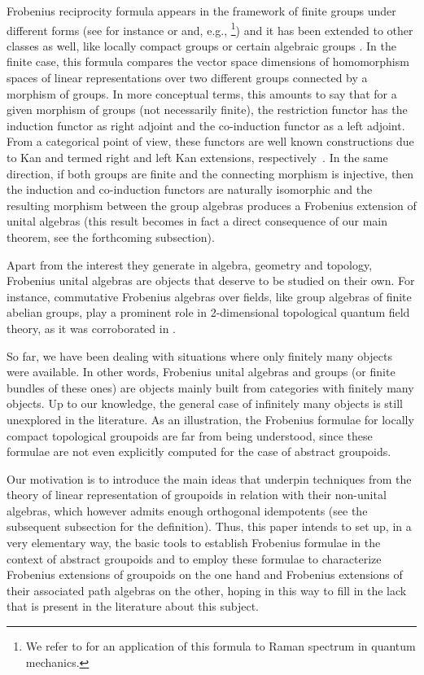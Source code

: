 \documentclass[10pt,a4paper]{amsart}
\numberwithin{equation}{section}
\begin{document}
Frobenius reciprocity formula appears in the framework of finite groups under different forms (see for instance \cite[equation~(3.4), p.~109]{Sternberg:1994} or \cite[equation~(3.7), p.~111]{Sternberg:1994} and, e.g., \cite[Proposition~2.3.9]{Kowalski:2014}\footnote{We refer to \cite[Section~3.6, p.~128]{Sternberg:1994} for an application of this formula to Raman spectrum in quantum mechanics.}) and it has been extended to other classes as well, like locally compact groups \cite{Mackey:1953, MooreC:1962} or certain algebraic groups \cite{Howe:1971}. In the finite case, this formula compares the vector space dimensions of homomorphism spaces of linear representations over two different groups connected by a morphism of groups. In more conceptual terms, this amounts to say that for a given morphism of groups (not necessarily finite), the restriction
functor has the induction functor as right adjoint and the co-induction functor as a left adjoint. From a categorical point of view, these functors are well known constructions due to Kan and termed right and left Kan extensions, respectively~\cite{MacLane}. In the same direction, if both groups are finite and the connecting morphism is injective, then the induction and co-induction functors are naturally isomorphic and the resulting morphism between the group algebras produces a Frobenius extension of unital algebras \cite{Kadison:1999} (this result becomes in fact a direct consequence of our main theorem, see the forthcoming subsection).

Apart from the interest they generate in algebra, geometry and topology, Frobenius unital algebras are objects that deserve to be studied on their own. For instance, commutative Frobenius algebras over fields, like group algebras of finite abelian groups, play a prominent role in 2-dimensional topological quantum field theory, as it was corroborated in \cite{Kock:2003}.

So far, we have been dealing with situations where only finitely many objects were available. In other words, Frobenius unital algebras and groups (or finite bundles of these ones) are objects mainly built from categories with finitely many objects. Up to our knowledge, the general case of infinitely many objects is still unexplored in the literature. As an illustration, the Frobenius formulae for locally compact topological groupoids are far from being understood, since these formulae are not even explicitly computed for the case of abstract groupoids.

 Our motivation is to introduce the main ideas that underpin techniques from the theory of linear representation of groupoids in relation with their non-unital algebras, which however admits enough orthogonal idempotents (see the subsequent subsection for the definition). Thus, this paper intends to set up, in a very elementary way, the basic tools to establish Frobenius formulae in the context of abstract groupoids and to employ these formulae to characterize Frobenius extensions of groupoids on the one hand and Frobenius extensions of their associated path algebras on the other, hoping in this way to fill in the lack that is present in the literature about this subject.
\end{document}
